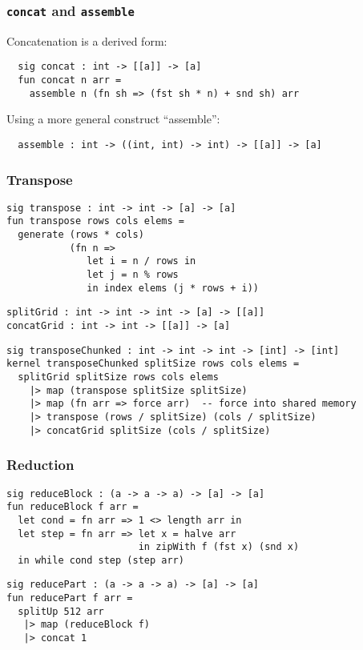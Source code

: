 \documentclass{beamer}
\begin{document}
\begin{frame}[fragile]
\frametitle{\texttt{concat} and \texttt{assemble}}

Concatenation is a derived form:
\begin{verbatim}
  sig concat : int -> [[a]] -> [a]
  fun concat n arr =
    assemble n (fn sh => (fst sh * n) + snd sh) arr
\end{verbatim}
\vspace{5mm}
\pause
Using a more general construct ``assemble'':
\begin{verbatim}
  assemble : int -> ((int, int) -> int) -> [[a]] -> [a]
\end{verbatim}

\end{frame}


\begin{frame}[fragile]
\frametitle{Transpose}
{\footnotesize

\begin{verbatim}
sig transpose : int -> int -> [a] -> [a]
fun transpose rows cols elems =
  generate (rows * cols)
           (fn n =>
              let i = n / rows in
              let j = n % rows
              in index elems (j * rows + i))
\end{verbatim}

\pause
\begin{verbatim}
splitGrid : int -> int -> int -> [a] -> [[a]]
concatGrid : int -> int -> [[a]] -> [a]
\end{verbatim}

\pause
\begin{verbatim}
sig transposeChunked : int -> int -> int -> [int] -> [int]
kernel transposeChunked splitSize rows cols elems =
  splitGrid splitSize rows cols elems
    |> map (transpose splitSize splitSize)
    |> map (fn arr => force arr)  -- force into shared memory
    |> transpose (rows / splitSize) (cols / splitSize)
    |> concatGrid splitSize (cols / splitSize)
\end{verbatim}
}
\end{frame}

\begin{frame}[fragile]
  \frametitle{Reduction}
\begin{verbatim}
sig reduceBlock : (a -> a -> a) -> [a] -> [a]
fun reduceBlock f arr =
  let cond = fn arr => 1 <> length arr in
  let step = fn arr => let x = halve arr
                       in zipWith f (fst x) (snd x)
  in while cond step (step arr)
\end{verbatim}
\pause
\begin{verbatim}
sig reducePart : (a -> a -> a) -> [a] -> [a]
fun reducePart f arr =
  splitUp 512 arr
   |> map (reduceBlock f)
   |> concat 1
\end{verbatim}
\end{frame}
\end{document}
